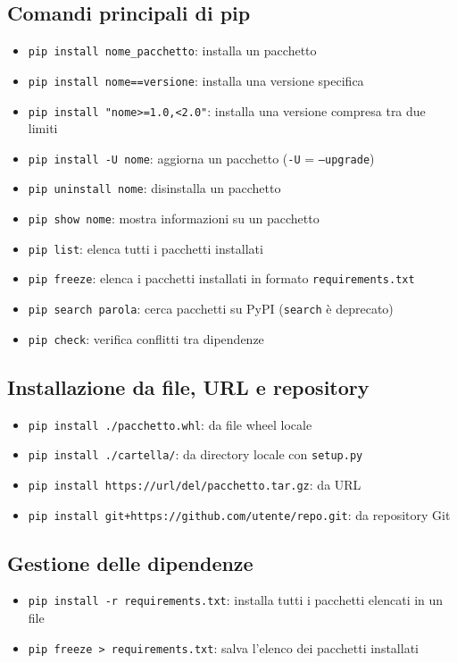 \documentclass[a4paper,12pt]{article}
\begin{document}
\subsection*{Comandi principali di pip}
\begin{itemize}
    \item \texttt{pip install nome\_pacchetto}: installa un pacchetto
    \item \texttt{pip install nome==versione}: installa una versione specifica
    \item \texttt{pip install "nome>=1.0,<2.0"}: installa una versione compresa tra due limiti
    \item \texttt{pip install -U nome}: aggiorna un pacchetto (\texttt{-U} = \texttt{--upgrade})
    \item \texttt{pip uninstall nome}: disinstalla un pacchetto
    \item \texttt{pip show nome}: mostra informazioni su un pacchetto
    \item \texttt{pip list}: elenca tutti i pacchetti installati
    \item \texttt{pip freeze}: elenca i pacchetti installati in formato \texttt{requirements.txt}
    \item \texttt{pip search parola}: cerca pacchetti su PyPI (\texttt{search} è deprecato)
    \item \texttt{pip check}: verifica conflitti tra dipendenze
\end{itemize}

\subsection*{Installazione da file, URL e repository}
\begin{itemize}
    \item \texttt{pip install ./pacchetto.whl}: da file wheel locale
    \item \texttt{pip install ./cartella/}: da directory locale con \texttt{setup.py}
    \item \texttt{pip install https://url/del/pacchetto.tar.gz}: da URL
    \item \texttt{pip install git+https://github.com/utente/repo.git}: da repository Git
\end{itemize}

\subsection*{Gestione delle dipendenze}
\begin{itemize}
    \item \texttt{pip install -r requirements.txt}: installa tutti i pacchetti elencati in un file
    \item \texttt{pip freeze > requirements.txt}: salva l'elenco dei pacchetti installati
\end{itemize}
\end{document}

